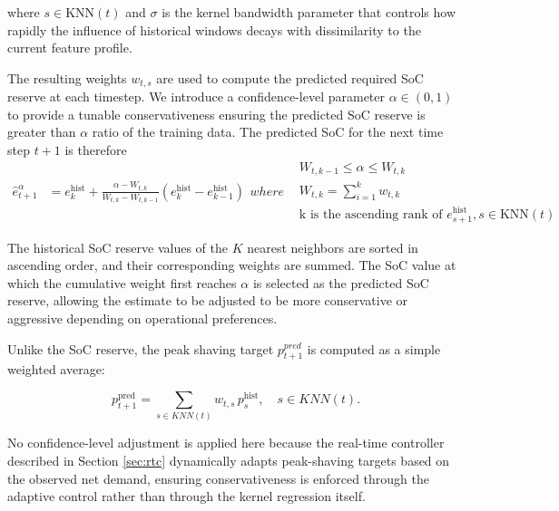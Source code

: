 \documentclass[conference]{IEEEtran}
\newcommand{\todo}[1]{\textcolor{red}{#1}} %
\begin{document}
\noindent where $s \in \mathrm{KNN}(t)$ and $\sigma$ is the kernel bandwidth parameter that controls how rapidly the influence of historical windows decays with dissimilarity to the current feature profile.

The resulting weights $w_{t,s}$ are used to compute the predicted required SoC reserve at each timestep. We introduce a confidence-level parameter $\alpha \in (0,1)$ to provide a tunable conservativeness ensuring the predicted SoC reserve is greater than $\alpha$ ratio of the training data. The predicted SoC for the next time step $t+1$ is therefore
\begin{subequations}
\begin{align}
    \hat{e}^{\alpha}_{t+1} &= e^{\text{hist}}_{k} + \frac{\alpha-W_{t,k}}{W_{t,k}-W_{t,k-1}}(e^{\text{hist}}_{k}-e^{\text{hist}}_{k-1}) %
\end{align}
where
\begin{align}
    & W_{t,k-1} \leq \alpha \leq W_{t,k} \\
    &  W_{t,k} = \textstyle \sum_{i=1}^k w_{t,k} \\
    & \text{k is the ascending rank of $e^{\text{hist}}_{s+1}$}, s \in \mathrm{KNN}(t)
\end{align}
\end{subequations}

The historical SoC reserve values of the $K$ nearest neighbors are sorted in ascending order, and their corresponding weights are summed. The SoC value at which the cumulative weight first reaches $\alpha$ is selected as the predicted SoC reserve, allowing the estimate to be adjusted to be more conservative or aggressive depending on operational preferences.

Unlike the SoC reserve, the peak shaving target $p_{t+1}^{pred}$ is computed as a simple weighted average:

\begin{equation}
p_{t+1}^{\text{pred}} = \sum_{s \in KNN(t)} w_{t,s}\, p^{\text{hist}}_s, \quad s \in KNN(t).
\end{equation}

No confidence-level adjustment is applied here because the real-time controller described in Section \ref{sec:rtc} dynamically adapts peak-shaving targets based on the observed net demand, ensuring conservativeness is enforced through the adaptive control rather than through the kernel regression itself.
\end{document}
